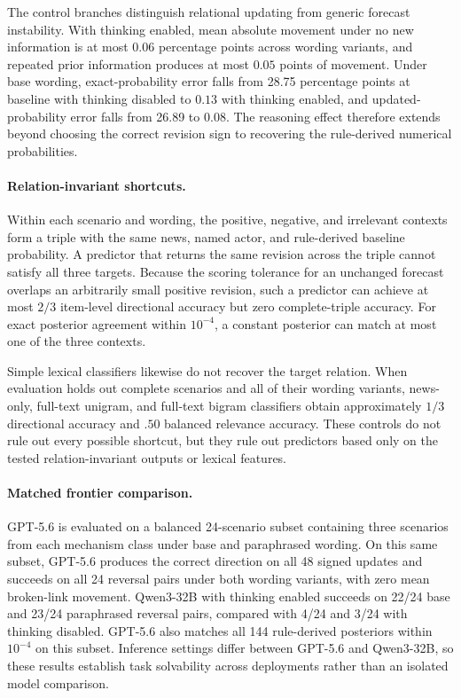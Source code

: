 The control branches distinguish relational updating from generic forecast instability.
With thinking enabled, mean absolute movement under no new information is at most $0.06$ percentage points across wording variants, and repeated prior information produces at most $0.05$ points of movement.
Under base wording, exact-probability error falls from 28.75 percentage points at baseline with thinking disabled to $0.13$ with thinking enabled, and updated-probability error falls from 26.89 to $0.08$.
The reasoning effect therefore extends beyond choosing the correct revision sign to recovering the rule-derived numerical probabilities.

\paragraph{Relation-invariant shortcuts.}

Within each scenario and wording, the positive, negative, and irrelevant contexts form a triple with the same news, named actor, and rule-derived baseline probability.
A predictor that returns the same revision across the triple cannot satisfy all three targets.
Because the scoring tolerance for an unchanged forecast overlaps an arbitrarily small positive revision, such a predictor can achieve at most $2/3$ item-level directional accuracy but zero complete-triple accuracy.
For exact posterior agreement within $10^{-4}$, a constant posterior can match at most one of the three contexts.

Simple lexical classifiers likewise do not recover the target relation.
When evaluation holds out complete scenarios and all of their wording variants, news-only, full-text unigram, and full-text bigram classifiers obtain approximately $1/3$ directional accuracy and $.50$ balanced relevance accuracy.
These controls do not rule out every possible shortcut, but they rule out predictors based only on the tested relation-invariant outputs or lexical features.

\paragraph{Matched frontier comparison.}

GPT-5.6 is evaluated on a balanced 24-scenario subset containing three scenarios from each mechanism class under base and paraphrased wording.
On this same subset, GPT-5.6 produces the correct direction on all 48 signed updates and succeeds on all 24 reversal pairs under both wording variants, with zero mean broken-link movement.
Qwen3-32B with thinking enabled succeeds on 22/24 base and 23/24 paraphrased reversal pairs, compared with 4/24 and 3/24 with thinking disabled.
GPT-5.6 also matches all 144 rule-derived posteriors within $10^{-4}$ on this subset.
Inference settings differ between GPT-5.6 and Qwen3-32B, so these results establish task solvability across deployments rather than an isolated model comparison.

